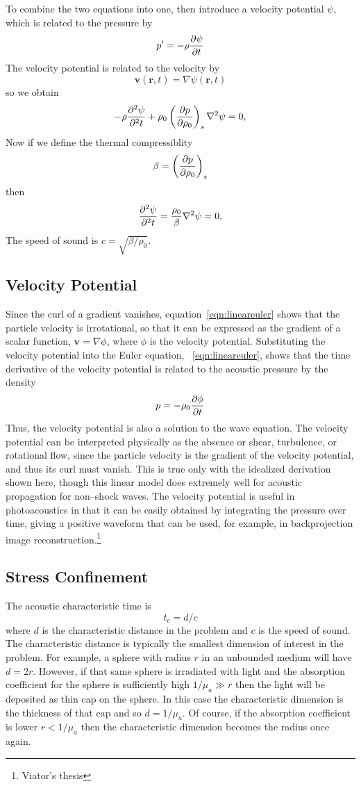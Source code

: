 \documentclass{article}
\begin{document}
To combine the two equations into one, then introduce a velocity potential $\psi$, which
is related to the pressure by
$$
p' = -\rho {\partial \psi\over\partial t}
$$
The velocity potential is related to the velocity by
$$
\mathbf{v}(\mathbf{r},t)=\nabla \psi(\mathbf{r},t)
$$
so we obtain
$$
-\rho {\partial^2 \psi\over\partial^2 t} + \rho_0\left({\partial p\over \partial \rho_0}\right)_s\nabla^2 \psi = 0,
$$
Now if we define the thermal compressiblity
$$
\beta = \left({\partial p\over \partial \rho_0}\right)_s
$$
then
$$
{\partial^2 \psi\over\partial^2 t} = {\rho_0\over \beta} \nabla^2 \psi = 0,
$$
The speed of sound is $c=\sqrt{\beta/\rho_0}$.

\subsection{Velocity Potential}

\centering
Since the curl of a gradient vanishes, equation~\ref{eqn:lineareuler}
shows that the particle velocity is irrotational, so that it can be
expressed as the gradient of a scalar function, $\mathbf{v}=\nabla \phi$,
where $\phi$ is the velocity potential.  Substituting the velocity
potential into the Euler equation, ~\ref{eqn:lineareuler}, shows that
the time derivative of the velocity potential is related to the acoustic
pressure by the density
$$
p=-\rho_0 {\partial \phi\over \partial t}
$$
Thus, the velocity potential is also a solution to the wave equation. 
The velocity potential can be interpreted physically as the absence or
shear, turbulence, or rotational flow, since the particle velocity is
the gradient of the velocity potential, and thus its curl must vanish. 
This is true only with the idealized derivation shown here, though this
linear model does extremely well for acoustic propagation for non--shock
waves.  The velocity potential is useful in photoacoustics
in that it can be easily obtained by integrating the pressure over time,
giving a positive waveform that can be used, for example, in
backprojection image reconstruction.\footnote{Viator's thesis}

\subsection{Stress Confinement}
The acoustic characteristic time is
$$
t_c = d/c
$$
where $d$ is the characteristic distance in the problem and $c$ is the speed of sound.
The characteristic distance is typically the smallest dimension of interest
in the problem.  For example, a sphere with radius $r$ in an unbounded medium
will have $d=2r$.  However, if that same sphere is irradiated with light and the
absorption coefficient for the sphere is sufficiently high $1/\mu_a\gg r$ then
the light will be deposited as thin cap on the sphere.  In this case the characteristic
dimension is the thickness of that cap and so $d = 1/\mu_a$.  Of course, if the 
absorption coefficient is lower $r < 1/\mu_a$ then the characteristic dimension 
becomes the radius once again.  
\end{document}
